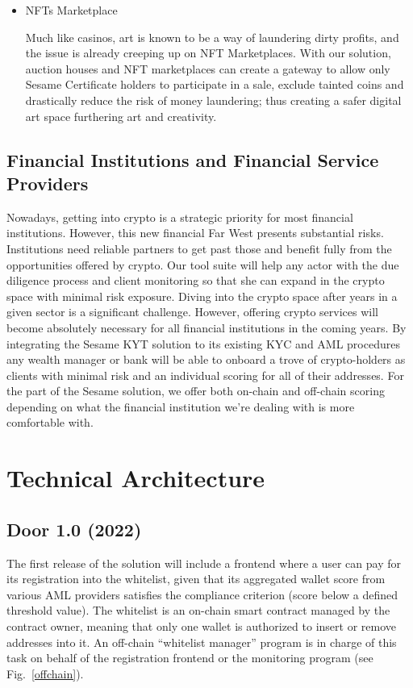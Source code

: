 ﻿\documentclass[a4paper]{article}
\begin{document}
\begin{itemize}
\item NFTs Marketplace

Much like casinos, art is known to be a way of laundering dirty profits, and the issue is already creeping up on NFT Marketplaces. With our solution, auction houses and NFT marketplaces can create a gateway to allow only Sesame Certificate holders to participate in a sale, exclude tainted coins and drastically reduce the risk of money laundering; thus creating a safer digital art space furthering art and creativity.
\end{itemize}

\subsection{Financial Institutions and Financial Service Providers}
Nowadays, getting into crypto is a strategic priority for most financial institutions. However, this new financial Far West presents substantial risks. Institutions need reliable partners to get past those and benefit fully from the opportunities offered by crypto. Our tool suite will help any actor with the due diligence process and client monitoring so that she can expand in the crypto space with minimal risk exposure.
Diving into the crypto space after years in a given sector is a significant challenge. However, offering crypto services will become absolutely necessary for all financial institutions in the coming years. By integrating the Sesame KYT solution to its existing KYC and AML procedures any wealth manager or bank will be able to onboard a trove of crypto-holders as clients with minimal risk and an individual scoring for all of their addresses. For the part of the Sesame solution, we offer both on-chain and off-chain scoring depending on what the financial institution we’re dealing with is more comfortable with.

\section{Technical Architecture}
\subsection{Door 1.0 (2022)}

The first release of the solution will include a frontend where a user can pay for its registration into the whitelist, given that its aggregated wallet score from various AML providers satisfies the compliance criterion (score below a defined threshold value).
The whitelist is an on-chain smart contract managed by the contract owner, meaning that only one wallet is authorized to insert or remove addresses into it. An off-chain “whitelist manager” program is in charge of this task on behalf of the registration frontend or the monitoring program (see Fig.~\ref{offchain}). \\
\end{document}
